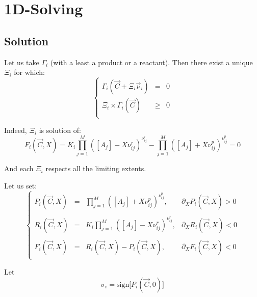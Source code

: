 \documentclass[aps,12pt]{revtex4}
\begin{document}
\section{1D-Solving}

\subsection{Solution}

Let us take $\Gamma_i$ (with a least a product or a reactant).
Then there exist a unique $\Xi_i$ for which:
\begin{equation}
\left\lbrace
\begin{array}{rcl}
	\Gamma_i(\vec{C} + \Xi_i \vec{\nu}_i ) & = & 0\\
	 \Xi_i \times \Gamma_i(\vec{C}) &\geq  &0\\
\end{array}
\right.
\end{equation}
 
Indeed, $\Xi_i$ is solution of:
\begin{equation}
	 F_i(\vec{C},X) =  K_i \prod_{j=1}^{M} \left([A_j] - X \nu^r_{ij}\right)^{\nu^r_{ij}} 
	- \prod_{j=1}^{M} \left([A_j] + X \nu^p_{ij} \right)^{\nu^p_{ij}} = 0
\end{equation} 

And each $\Xi_i$ respects all the limiting extents.


Let us set:
\begin{equation}
\left\lbrace
\begin{array}{rcll}
	P_i(\vec{C},X) & = & \displaystyle \prod_{j=1}^{M} \left([A_j] + X \nu^p_{ij} \right)^{\nu^p_{ij}}, & \partial_X P_i(\vec{C},X) > 0 \\
	\\
	R_i(\vec{C},X) & = & \displaystyle K_i \prod_{j=1}^{M} \left([A_j] - X \nu^r_{ij}\right)^{\nu^r_{ij}}, & \partial_X R_i(\vec{C},X) < 0 \\
	\\
	 F_i(\vec{C},X) & = & R_i(\vec{C},X)  - P_i(\vec{C},X), & \partial_X F_i(\vec{C},X) < 0\\
\end{array}
\right.
\end{equation}

Let
\begin{equation}
	\sigma_i = \mathrm{sign}\lbrack P_i(\vec{C},0) \rbrack
\end{equation}
\end{document}
